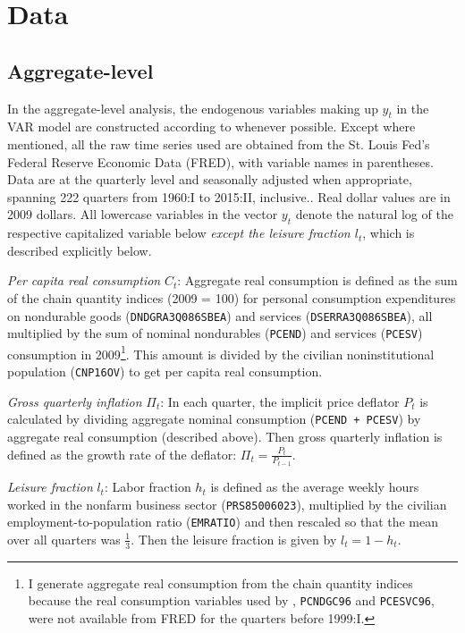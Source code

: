 \section{Data}

\subsection{Aggregate-level}
\label{aggregate-data}

In the aggregate-level analysis, the endogenous variables making up $y_t$ in the VAR model are constructed according to \cite{collard11} whenever possible. Except where mentioned, all the raw time series used are obtained from the St. Louis Fed's Federal Reserve Economic Data (FRED), with variable names in parentheses. Data are at the quarterly level and seasonally adjusted when appropriate, spanning 222 quarters from 1960:I to 2015:II, inclusive.. Real dollar values are in 2009 dollars. All lowercase variables in the vector $y_t$ denote the natural log of the respective capitalized variable below \textit{except the leisure fraction $l_t$}, which is described explicitly below.

\textit{Per capita real consumption} $C_t$: Aggregate real consumption is defined as the sum of the chain quantity indices (2009 = 100) for personal consumption expenditures on nondurable goods (\texttt{DNDGRA3Q086SBEA}) and services (\texttt{DSERRA3Q086SBEA}), all multiplied by the sum of nominal nondurables (\texttt{PCEND}) and services (\texttt{PCESV}) consumption in 2009\footnote{I generate aggregate real consumption from the chain quantity indices because the real consumption variables used by \cite{collard11}, \texttt{PCNDGC96} and \texttt{PCESVC96}, were not available from FRED for the quarters before 1999:I.}. This amount is divided by the civilian noninstitutional population (\texttt{CNP16OV}) to get per capita real consumption.

\textit{Gross quarterly inflation} $\Pi_t$: In each quarter, the implicit price deflator $P_t$ is calculated by dividing aggregate nominal consumption (\texttt{PCEND + PCESV}) by aggregate real consumption (described above). Then gross quarterly inflation is defined as the growth rate of the deflator: $\Pi_t = \frac{P_t}{P_{t-1}}$.

\textit{Leisure fraction} $l_t$: Labor fraction $h_t$ is defined as the average weekly hours worked in the nonfarm business sector (\texttt{PRS85006023}), multiplied by the civilian employment-to-population ratio (\texttt{EMRATIO}) and then rescaled so that the mean over all quarters was $\frac{1}{3}$. Then the leisure fraction is given by $l_t = 1 - h_t$.

